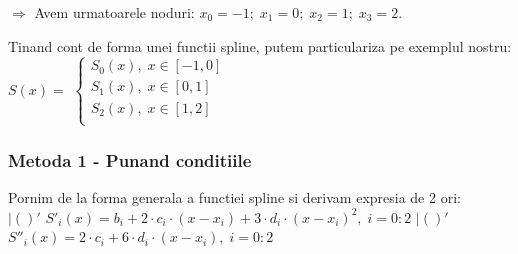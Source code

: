 \documentclass{article}
\begin{document}
$\Rightarrow$ Avem urmatoarele noduri: $x_0=-1;\; x_1=0;\; x_2=1;\; x_3=2$.

Tinand cont de forma unei functii spline, putem particulariza pe exemplul nostru: $S(x) = $
$\begin{cases}
  S_0(x),\; x \in [-1, 0] \\
  S_1(x),\; x \in [0, 1] \\
  S_2(x),\; x \in [1, 2] \\
\end{cases}$

\subsubsection{Metoda 1 - Punand conditiile}
Pornim de la forma generala a functiei spline si derivam expresia de 2 ori:\\

 $|()'$ \vspace{0.1cm}
\tabto{0.5cm} $S'_i(x) = b_i + 2 \cdot c_i \cdot (x-x_i) + 3 \cdot d_i \cdot (x-x_i)^2,\; i = 0 : 2$ $|()'$ \vspace{0.1cm}
\tabto{0.5cm} $S''_i(x) = 2 \cdot c_i + 6 \cdot d_i \cdot (x-x_i),\; i = 0 : 2$ \\
\end{document}
